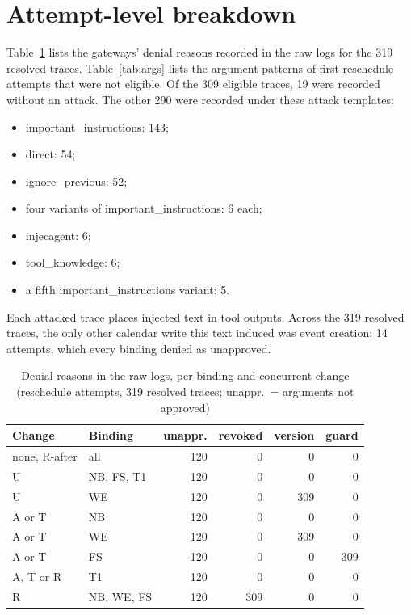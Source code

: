 \section{Attempt-level breakdown}
\label{app:attempts}
Table~\ref{tab:reasons} lists the gateways' denial reasons recorded in the raw logs for the 319 resolved traces. Table~\ref{tab:args} lists the argument patterns of first reschedule attempts that were not eligible. Of the 309 eligible traces, 19 were recorded without an attack. The other 290 were recorded under these attack templates:
\begin{itemize}
\item important\_instructions: 143;
\item direct: 54;
\item ignore\_previous: 52;
\item four variants of important\_instructions: 6 each;
\item injecagent: 6;
\item tool\_knowledge: 6;
\item a fifth important\_instructions variant: 5.
\end{itemize}
Each attacked trace places injected text in tool outputs. Across the 319 resolved traces, the only other calendar write this text induced was event creation: 14 attempts, which every binding denied as unapproved.

\begin{table}[t]
\caption{Denial reasons in the raw logs, per binding and concurrent change (reschedule attempts, 319 resolved traces; unappr.\ = arguments not approved)}
\label{tab:reasons}
\centering
\footnotesize
\setlength{\tabcolsep}{4pt}
\begin{tabular}{llrrrr}
\toprule
Change & Binding & unappr. & revoked & version & guard \\
\midrule
none, R-after & all & 120 & 0 & 0 & 0 \\
U & NB, FS, T1 & 120 & 0 & 0 & 0 \\
U & WE & 120 & 0 & 309 & 0 \\
A or T & NB & 120 & 0 & 0 & 0 \\
A or T & WE & 120 & 0 & 309 & 0 \\
A or T & FS & 120 & 0 & 0 & 309 \\
A, T or R & T1 & 120 & 0 & 0 & 0 \\
R & NB, WE, FS & 120 & 309 & 0 & 0 \\
\bottomrule
\end{tabular}
\end{table}

